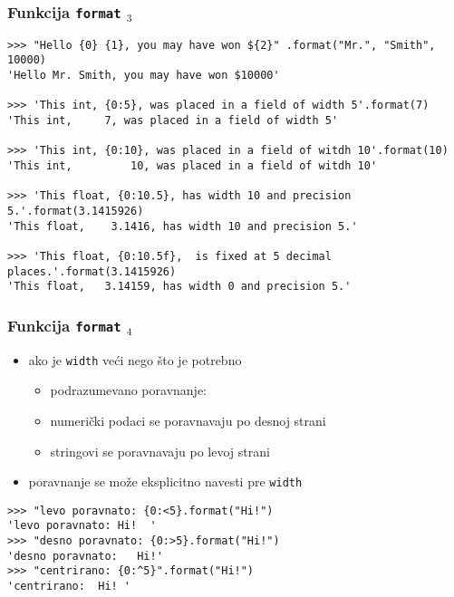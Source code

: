 \documentclass[utf8,compress,aspectratio=169]{beamer}
\begin{document}
\begin{frame}[fragile,shrink=25]
  \frametitle{Funkcija \texttt{format} $_3$}
\begin{verbatim}
>>> "Hello {0} {1}, you may have won ${2}" .format("Mr.", "Smith", 10000)
'Hello Mr. Smith, you may have won $10000'

>>> 'This int, {0:5}, was placed in a field of width 5'.format(7)
'This int,     7, was placed in a field of width 5'

>>> 'This int, {0:10}, was placed in a field of witdh 10'.format(10)
'This int,         10, was placed in a field of witdh 10'

>>> 'This float, {0:10.5}, has width 10 and precision 5.'.format(3.1415926)
'This float,    3.1416, has width 10 and precision 5.'

>>> 'This float, {0:10.5f},  is fixed at 5 decimal places.'.format(3.1415926)
'This float,   3.14159, has width 0 and precision 5.'
\end{verbatim}
\end{frame}

\begin{frame}[fragile]
  \frametitle{Funkcija \texttt{format} $_4$}
  \begin{itemize}
    \item ako je \texttt{width} veći nego što je potrebno
    \begin{itemize}
      \item podrazumevano poravnanje:
      \item numerički podaci se poravnavaju po desnoj strani
      \item stringovi se poravnavaju po levoj strani
    \end{itemize}
    \item poravnanje se može eksplicitno navesti pre \texttt{width}
  \end{itemize}
\begin{verbatim}
>>> "levo poravnato: {0:<5}.format("Hi!")
'levo poravnato: Hi!  '
>>> "desno poravnato: {0:>5}.format("Hi!")
'desno poravnato:   Hi!'
>>> "centrirano: {0:^5}".format("Hi!")
'centrirano:  Hi! '
\end{verbatim}
\end{frame}
\end{document}
